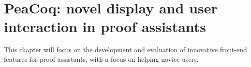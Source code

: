 \chapter{PeaCoq: novel display and user interaction in proof
assistants}\label{peacoq}

This chapter will focus on the development and evaluation of innovative
front-end features for proof assistants, with a focus on helping novice users.






